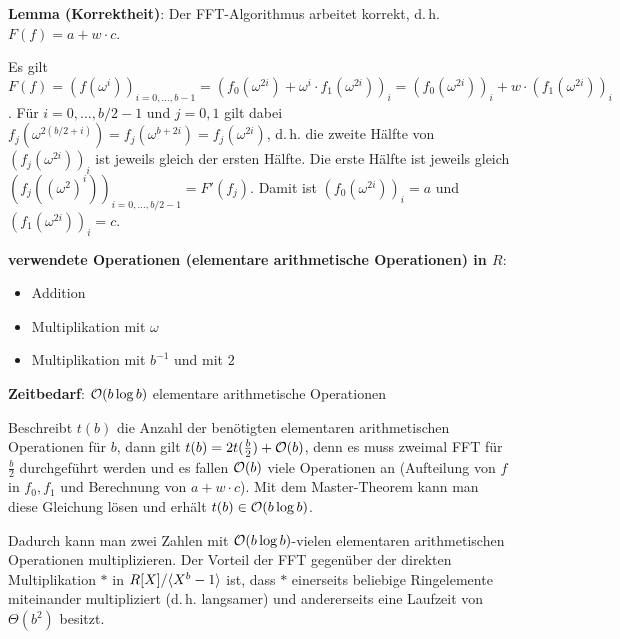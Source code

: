 \textbf{Lemma (Korrektheit)}:
Der FFT-Algorithmus arbeitet korrekt, d.\,h. $F(f) = a + w \cdot c$.

\begin{Beweis}
    Es gilt
    $F(f)
    = (f(\omega^i))_{i=0,\dotsc,b-1}
    = (f_0(\omega^{2i}) + \omega^i \cdot f_1(\omega^{2i}))_i
    = (f_0(\omega^{2i}))_i + w \cdot (f_1(\omega^{2i}))_i$.
    Für $i = 0, \dotsc, b/2-1$ und $j = 0, 1$ gilt dabei
    $f_j(\omega^{2(b/2+i)})
    = f_j(\omega^{b+2i})
    = f_j(\omega^{2i})$, d.\,h. die zweite Hälfte von $(f_j(\omega^{2i}))_i$ ist
    jeweils gleich der ersten Hälfte.
    Die erste Hälfte ist jeweils gleich $(f_j((\omega^2)^i))_{i=0,\dotsc,b/2-1} = F'(f_j)$.
    Damit ist $(f_0(\omega^{2i}))_i = a$ und $(f_1(\omega^{2i}))_i = c$.
\end{Beweis}

\linie

\textbf{verwendete Operationen (elementare arithmetische Operationen) in $R$}:
\begin{itemize}
    \item
    Addition
    
    \item
    Multiplikation mit $\omega$
    
    \item
    Multiplikation mit $b^{-1}$ und mit $2$
\end{itemize}

\textbf{Zeitbedarf}:
$\mathcal{O}(b \log b)$ elementare arithmetische Operationen

\begin{Beweis}
    Beschreibt $t(b)$ die Anzahl der benötigten elementaren arithmetischen Operationen für $b$,
    dann gilt $t(b) = 2t(\frac{b}{2}) + \mathcal{O}(b)$,
    denn es muss zweimal FFT für $\frac{b}{2}$ durchgeführt werden und es
    fallen $\mathcal{O}(b)$ viele Operationen an (Aufteilung von $f$ in $f_0, f_1$ und
    Berechnung von $a + w \cdot c$).
    Mit dem Master-Theorem kann man diese Gleichung lösen und erhält
    $t(b) \in \mathcal{O}(b \log b)$.
\end{Beweis}

Dadurch kann man zwei Zahlen mit $\mathcal{O}(b \log b)$-vielen elementaren arithmetischen Operationen
multiplizieren.
Der Vorteil der FFT gegenüber der direkten Multiplikation $\ast$ in $R[X]/\langle X^b - 1\rangle$ ist,
dass $\ast$ einerseits beliebige Ringelemente miteinander multipliziert (d.\,h. langsamer)
und andererseits eine Laufzeit von $\Theta(b^2)$ besitzt.

\pagebreak

